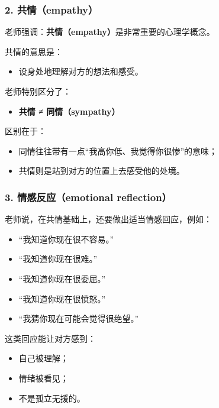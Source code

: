 \documentclass[
  chinese,
  9pt,
  a4paper,
]{ctexart}
\providecommand{\tightlist}{%
  \setlength{\itemsep}{0pt}\setlength{\parskip}{0pt}}
\begin{document}
\subsubsection{2. 共情（empathy）}\label{ux5171ux60c5empathy}

老师强调：\textbf{共情（empathy）}是非常重要的心理学概念。

共情的意思是：

\begin{itemize}
\tightlist
\item
  设身处地理解对方的想法和感受。
\end{itemize}

老师特别区分了：

\begin{itemize}
\tightlist
\item
  \textbf{共情 ≠ 同情（sympathy）}
\end{itemize}

区别在于：

\begin{itemize}
\tightlist
\item
  同情往往带有一点``我高你低、我觉得你很惨''的意味；
\item
  共情则是站到对方的位置上去感受他的处境。
\end{itemize}

\subsubsection{3. 情感反应（emotional
reflection）}\label{ux60c5ux611fux53cdux5e94emotional-reflection}

老师说，在共情基础上，还要做出适当情感回应，例如：

\begin{itemize}
\tightlist
\item
  ``我知道你现在很不容易。''
\item
  ``我知道你现在很难。''
\item
  ``我知道你现在很委屈。''
\item
  ``我知道你现在很愤怒。''
\item
  ``我猜你现在可能会觉得很绝望。''
\end{itemize}

这类回应能让对方感到：

\begin{itemize}
\tightlist
\item
  自己被理解；
\item
  情绪被看见；
\item
  不是孤立无援的。
\end{itemize}
\end{document}
